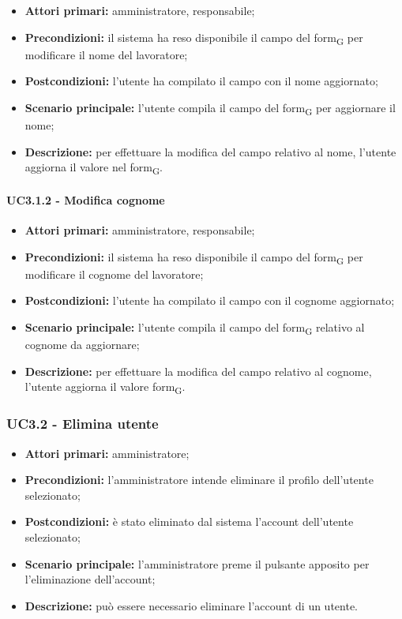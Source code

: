 \begin{itemize}
	\item 	\textbf{Attori primari:} amministratore, responsabile;
	\item 	\textbf{Precondizioni:} il sistema ha reso disponibile il campo del form\textsubscript{G} per modificare il nome del lavoratore;
	\item 	\textbf{Postcondizioni:}  l'utente ha compilato il campo con il nome aggiornato;
	\item 	\textbf{Scenario principale:} l'utente compila il campo del form\textsubscript{G} per aggiornare il nome;
	\item 	\textbf{Descrizione:} per effettuare la modifica del campo relativo al nome, l'utente aggiorna il valore nel form\textsubscript{G}.
\end{itemize}

\paragraph{UC3.1.2 - Modifica cognome}

\begin{itemize}
	\item 	\textbf{Attori primari:} amministratore, responsabile;
	\item 	\textbf{Precondizioni:} il sistema ha reso disponibile il campo del form\textsubscript{G} per modificare il cognome del lavoratore;
	\item 	\textbf{Postcondizioni:} l'utente ha compilato il campo con il cognome aggiornato;
	\item 	\textbf{Scenario principale:} l'utente compila il campo del form\textsubscript{G} relativo al cognome da aggiornare;
	\item 	\textbf{Descrizione:} per effettuare la modifica del campo relativo al cognome, l'utente aggiorna il valore form\textsubscript{G}.

\end{itemize}


\subsubsection{UC3.2 - Elimina utente}

\begin{itemize}
	\item 	\textbf{Attori primari:} amministratore;
	\item 	\textbf{Precondizioni:} l'amministratore intende eliminare il profilo dell'utente selezionato;
	\item 	\textbf{Postcondizioni:} è stato eliminato dal sistema l'account dell'utente selezionato;
	\item 	\textbf{Scenario principale:} l'amministratore preme il pulsante apposito per l'eliminazione dell'account;
	\item 	\textbf{Descrizione:} può essere necessario eliminare l'account di un utente.
\end{itemize}

